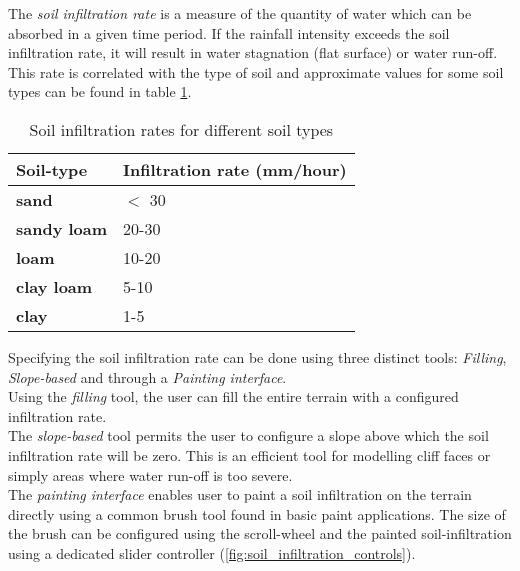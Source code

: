 The \textit{soil infiltration rate} is a measure of the quantity of water which can be absorbed in a given time period. If the rainfall intensity exceeds the soil infiltration rate, it will result in water stagnation (flat surface) or water run-off. This rate is correlated with the type of soil and approximate values for some soil types can be found in table \ref{tab:control_types}.

\begin{table}[h]
  \centering
	    \begin{tabular}{|p{5cm}|p{8cm}|}
  	    \hline	
  	    \textbf{Soil-type} & \textbf{Infiltration rate (mm/hour)} \\
		\hline
		\textbf{sand} & $<$ 30 \\
		\hline
		\textbf{sandy loam} & 20-30 \\
		\hline
		\textbf{loam} & 10-20 \\
		\hline
		\textbf{clay loam} & 5-10 \\
		\hline
		\textbf{clay} & 1-5 \\
		\hline
		\end{tabular}
		\caption{Soil infiltration rates for different soil types \protect\footnotemark}
	  \label{tab:control_types}
\end{table}


Specifying the soil infiltration rate can be done using three distinct tools: \textit{Filling}, \textit{Slope-based} and through a \textit{Painting interface}.\\
Using the \textit{filling} tool, the user can fill the entire terrain with a configured infiltration rate.\\
The \textit{slope-based} tool permits the user to configure a slope above which the soil infiltration rate will be zero. This is an efficient tool for modelling cliff faces or simply areas where water run-off is too severe.\\
The \textit{painting interface} enables user to paint a soil infiltration on the terrain directly using a common brush tool found in basic paint applications. The size of the brush can be configured using the scroll-wheel and the painted soil-infiltration using a dedicated slider controller (\ref{fig:soil_infiltration_controls}).

